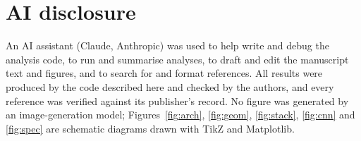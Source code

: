 \documentclass[twocolumn,linenumbers]{aastex702}
\begin{document}

\section*{AI disclosure}
An AI assistant (Claude, Anthropic) was used to help write and debug the analysis code, to run and summarise analyses, to draft and edit the manuscript text and figures, and to search for and format references. All results were produced by the code described here and checked by the authors, and every reference was verified against its publisher's record. No figure was generated by an image-generation model; Figures~\ref{fig:arch}, \ref{fig:geom}, \ref{fig:stack}, \ref{fig:cnn} and \ref{fig:spec} are schematic diagrams drawn with TikZ and Matplotlib.

\appendix
\onecolumngrid
\end{document}
